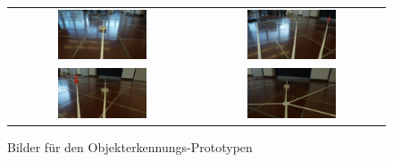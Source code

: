 \documentclass[../main.tex]{subfiles}
\begin{document}
\begin{center}
\begin{figure}[H]
\begin{tabular}{cc}
    \includegraphics[width=0.5\textwidth]{img/prototyping/objekterkennung/Bild1.jpg} &
    \includegraphics[width=0.5\textwidth]{img/prototyping/objekterkennung/Bild2.jpg} \\
    \includegraphics[width=0.5\textwidth]{img/prototyping/objekterkennung/Bild3.jpg} &
    \includegraphics[width=0.5\textwidth]{img/prototyping/objekterkennung/Bild4.jpg}
\end{tabular}
\caption{Bilder für den Objekterkennungs-Prototypen}
\end{figure}
\end{center}
\end{document}
